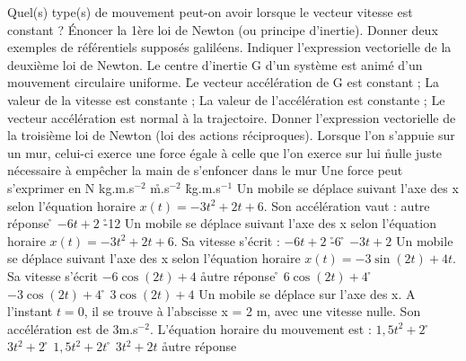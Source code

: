 \q
Quel(s) type(s) de mouvement peut-on avoir lorsque le vecteur vitesse est constant ?
\q	
Énoncer la 1ère loi de Newton (ou principe d'inertie).
\q
	Donner deux exemples de référentiels supposés galiléens.
 \q	
 Indiquer l’expression vectorielle de la deuxième loi de Newton.
\q
	Le centre d’inertie G d’un système est animé d’un mouvement circulaire uniforme.
\r
  Le vecteur accélération de G est constant ;
\rv
  La valeur de la vitesse est constante ;
\rv
  La valeur de l’accélération est constante ;
\rv
  Le vecteur accélération   est normal à la trajectoire.
\q	
Donner l’expression vectorielle de la troisième loi de Newton (loi des actions réciproques).
\q
Lorsque l'on s'appuie sur un mur, celui-ci exerce une force
\rv
égale à celle que l'on exerce sur lui
\r
nulle
\rv
juste nécessaire à empêcher la main de s'enfoncer dans le mur
\q
Une force peut s'exprimer en
\rv
N
\rv
kg.m.s$^{-2}$
\r
m.s$^{-2}$
\r
kg.m.s$^{-1}$
\q
Un mobile se déplace suivant l'axe des x selon l'équation horaire $x(t)=-3t^{2}+2t+6$. Son accélération vaut :
\rv
autre réponse
\r
$-6t+2$
\r
-12
\q
Un mobile se déplace suivant l'axe des x selon l'équation horaire $x(t)=-3t^{2}+2t+6$. Sa vitesse s'écrit :
\rv
$-6t+2$
\r
-6
\r
$-3t+2$
\q
Un mobile se déplace suivant l'axe des x selon l'équation horaire $x(t)=-3\sin(2t)+4t$. Sa vitesse s'écrit 
\rv
$-6\cos(2t)+4$
\r
autre réponse
\r
$6\cos(2t)+4$
\r
$-3\cos(2t)+4$
\r
$3\cos(2t)+4$
\q
Un mobile se déplace sur l'axe des x. A l'instant $t=0$, il se trouve à l'abscisse x = 2 m, avec une vitesse nulle. Son accélération est de 3m.s$^{-2}$.
L'équation horaire du mouvement est :
\rv
$1,5t^{2}+2$
\r
$3t^{2}+2$
\r
$1,5t^{2}+2t$
\r
$3t^{2}+2t$
\r
autre réponse
